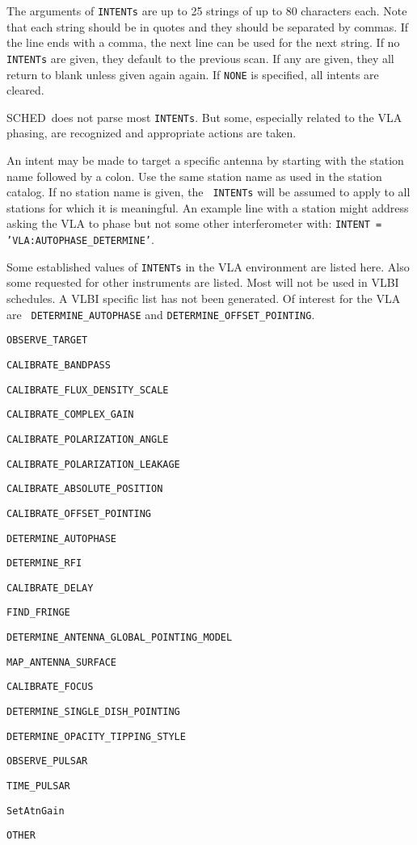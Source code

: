 \documentclass{report}
\newcommand{\schedb}{{\sc SCHED~}}
\begin{document}
The arguments of {\tt INTENTs} are up to 25 strings of up to 80
characters each.  Note that each string should be in quotes and they
should be separated by commas.  If the line ends with a comma, the
next line can be used for the next string.  If no {\tt INTENTs} are
given, they default to the previous scan.  If any are given, they all
return to blank unless given again again.  If {\tt NONE} is specified,
all intents are cleared.

\schedb does not parse most {\tt INTENTs}.  But some, especially related
to the VLA phasing, are recognized and appropriate actions are taken.

An intent may be made to target a specific antenna by starting with
the station name followed by a colon.  Use the same station name as
used in the station catalog.  If no station name is given, the {\tt
INTENTs} will be assumed to apply to all stations for which it is
meaningful.  An example line with a station might address asking the
VLA to phase but not some other interferometer with: 
{\tt INTENT = 'VLA:AUTOPHASE\_DETERMINE'}.

Some established values of {\tt INTENTs} in the VLA environment are
listed here.  Also some requested for other instruments are listed.
Most will not be used in VLBI schedules.  A VLBI
specific list has not been generated.  Of interest for the VLA are {\tt
DETERMINE\_AUTOPHASE} and {\tt DETERMINE\_OFFSET\_POINTING}.  

\begin{list}{}{\parsep 0em  \itemsep 0em }
\item {\tt OBSERVE\_TARGET}
\item {\tt CALIBRATE\_BANDPASS}
\item {\tt CALIBRATE\_FLUX\_DENSITY\_SCALE} 
\item {\tt CALIBRATE\_COMPLEX\_GAIN}
\item {\tt CALIBRATE\_POLARIZATION\_ANGLE}
\item {\tt CALIBRATE\_POLARIZATION\_LEAKAGE}
\item {\tt CALIBRATE\_ABSOLUTE\_POSITION}
\item {\tt CALIBRATE\_OFFSET\_POINTING}
\item {\tt DETERMINE\_AUTOPHASE}
\item {\tt DETERMINE\_RFI}
\item {\tt CALIBRATE\_DELAY}
\item {\tt FIND\_FRINGE}
\item {\tt DETERMINE\_ANTENNA\_GLOBAL\_POINTING\_MODEL}
\item {\tt MAP\_ANTENNA\_SURFACE}
\item {\tt CALIBRATE\_FOCUS}
\item {\tt DETERMINE\_SINGLE\_DISH\_POINTING}
\item {\tt DETERMINE\_OPACITY\_TIPPING\_STYLE}
\item {\tt OBSERVE\_PULSAR}
\item {\tt TIME\_PULSAR}
\item {\tt SetAtnGain}
\item {\tt OTHER}
\end{list}
\end{document}
